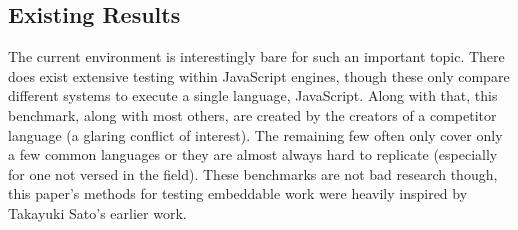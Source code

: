 \subsection{Existing Results}
The current environment is interestingly bare for such an important topic. There does exist extensive testing within JavaScript engines, though these only compare different systems to execute a single language, JavaScript\cite{arewefastyet}. Along with that, this benchmark, along with most others, are created by the creators of a competitor language (a glaring conflict of interest). The remaining few often only cover only a few common languages or they are almost always hard to replicate (especially for one not versed in the field). These benchmarks are not bad research though, this paper's methods for testing embeddable work were heavily inspired by Takayuki Sato's earlier work\cite{embench}.
